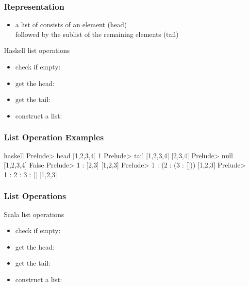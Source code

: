\documentclass[dvipsnames]{beamer}
\theoremstyle{plain}
\begin{document}
\begin{frame}
  \frametitle{Representation}

  \begin{itemize}
    \item a list of consists of an element (\alert{head})\\
      followed by the sublist of the remaining elements (\alert{tail})
  \end{itemize}

  \pause
  \medskip
  \begin{block}{Haskell list operations}
    \begin{itemize}
      \item check if empty: 
      \item get the head: 
      \item get the tail: 
      \item construct a list: 
    \end{itemize}
  \end{block}
\end{frame}

\begin{frame}[fragile]
  \frametitle{List Operation Examples}

  \begin{example}[Haskell]
    \begin{pygments}{haskell}
Prelude> head [1,2,3,4]
1
Prelude> tail [1,2,3,4]
[2,3,4]
Prelude> null [1,2,3,4]
False
Prelude> 1 : [2,3]
[1,2,3]
Prelude> 1 : (2 : (3 : []))
[1,2,3]
Prelude> 1 : 2 : 3 : []
[1,2,3]
    \end{pygments}
  \end{example}
\end{frame}

\begin{frame}
  \frametitle{List Operations}

  \begin{block}{Scala list operations}
    \begin{itemize}
      \item check if empty: 
      \item get the head: 
      \item get the tail: 
      \item construct a list: 
    \end{itemize}
  \end{block}
\end{frame}
\end{document}
